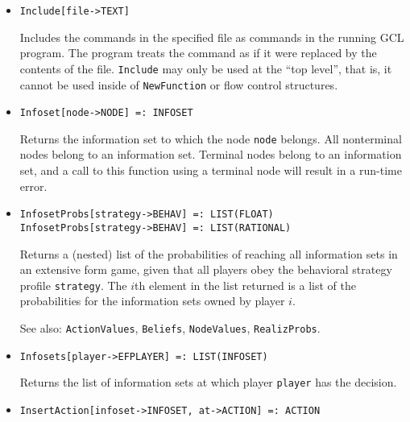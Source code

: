 \begin{itemize}
\item
\protect \large \begin{verbatim}
Include[file->TEXT]
\end{verbatim}\normalsize

\bd
Includes the commands in the specified file as commands
in the running GCL program.  The program treats the command as if it
were replaced by the contents of the file.  \verb+Include+ may only be used
at the ``top level'', that is, it cannot be used inside of \verb+NewFunction+
or flow control structures.
\ed

\item
\protect \large \begin{verbatim}
Infoset[node->NODE] =: INFOSET
\end{verbatim}\normalsize

\bd
Returns the information set to which the node \verb+node+
belongs.  All nonterminal nodes belong to an information set.  Terminal
nodes belong to an information set, and a call to this function using
a terminal node will result in a run-time error.
\ed

\item
\protect \large \begin{verbatim}
InfosetProbs[strategy->BEHAV] =: LIST(FLOAT)
InfosetProbs[strategy->BEHAV] =: LIST(RATIONAL)
\end{verbatim}\normalsize

\bd
Returns a (nested) list of the probabilities of reaching all information
sets in an extensive form game, given that all players obey the
behavioral strategy profile \verb+strategy+.  The $i$th element
in the list returned is a list of the probabilities for the information
sets owned by player $i$.
\item
[See also:] {\tt ActionValues}, {\tt Beliefs}, {\tt NodeValues},
{\tt RealizProbs}.
\ed

\item
\protect \large \begin{verbatim}
Infosets[player->EFPLAYER] =: LIST(INFOSET)
\end{verbatim}\normalsize

\bd
Returns the list of information sets at which player
\verb+player+ has the decision.
\ed

\item
\protect \large \begin{verbatim}
InsertAction[infoset->INFOSET, at->ACTION] =: ACTION
\end{verbatim}\normalsize


\end{itemize}

